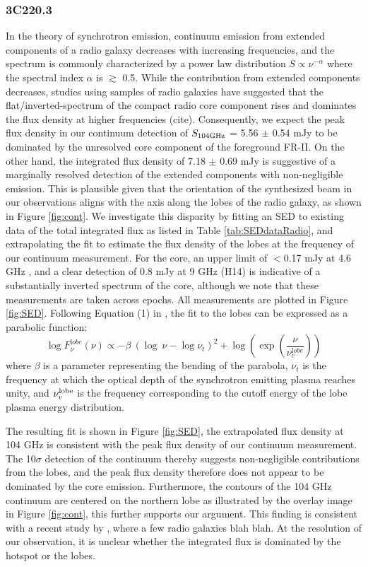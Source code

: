 \documentclass[twocolumn,apj,numberedappendix]{emulateapj}
\begin{document}
\subsubsection{3C220.3}
In the theory of synchrotron emission, continuum emission from extended components of a radio galaxy decreases with increasing frequencies, and the spectrum is commonly characterized by a power law distribution $S \propto \nu^{-\alpha}$ where the spectral index $\alpha$ is $\gtrsim$ 0.5. While the contribution from extended components decreases, studies using samples of radio galaxies have suggested that the flat/inverted-spectrum of the compact radio core component rises and dominates the flux density at higher frequencies (cite). Consequently, we expect the peak flux density in our continuum detection of $S_{\rm 104GHz}$ = 5.56 $\pm$ 0.54 mJy to be dominated by the unresolved core component of the foreground FR-II. On the other hand, the integrated flux density of 7.18 $\pm$ 0.69 mJy is suggestive of a marginally resolved detection of the extended components with non-negligible emission. This is plausible given that the orientation of the synthesized beam in our observations aligns with the axis along the 
lobes of the radio galaxy, as shown in Figure \ref{fig:cont}. We investigate this disparity by fitting an SED to existing data of the total integrated flux as listed in Table \ref{tab:SEDdataRadio}, and extrapolating the fit to estimate the flux density of the lobes at the frequency of our continuum measurement. For the core, an upper limit of $<$0.17 mJy at 4.6 GHz \citep{Mullin06a}, and a clear detection of 0.8 mJy at 9 GHz (H14) is indicative of a substantially inverted spectrum of the core, although we note that these measurements are taken across epochs. All measurements are plotted in Figure \ref{fig:SED}. 
Following Equation (1) in \citet{Cleary07a}, the fit to the lobes can be expressed as a parabolic function:
\begin{equation}
\log F_{\nu}^{\mathrm lobe} (\nu) \propto - \beta\ (\log\ \nu - \log \nu_{t})^2  + \log (\exp({\frac{\nu}{\nu_c^{\mathrm lobe}}}))
\end{equation}
where $\beta$ is a parameter representing the bending of the parabola, $\nu_t$ is the frequency at which the optical depth of the synchrotron emitting plasma reaches unity, and $\nu_v^{\rm lobe}$ is the frequency corresponding to the cutoff energy of the lobe plasma energy distribution. 

The resulting fit is shown in Figure \ref{fig:SED}, the extrapolated flux density at 104 GHz is consistent with the peak flux density of our continuum measurement. The 10$\sigma$ detection of the continuum thereby suggests
non-negligible contributions from the lobes, and the peak flux density therefore does not appear to be dominated by the core 
emission. Furthermore, the contours of the 104 GHz continuum are
centered on the northern lobe as illustrated by the overlay image in Figure \ref{fig:cont}, this further supports our argument. This finding is consistent with a recent study by \citet{Hardcastle08a}, where a few radio galaxies blah blah. At the resolution of our observation, it is unclear whether the integrated flux is dominated by the hotspot or the lobes. 
\end{document}
